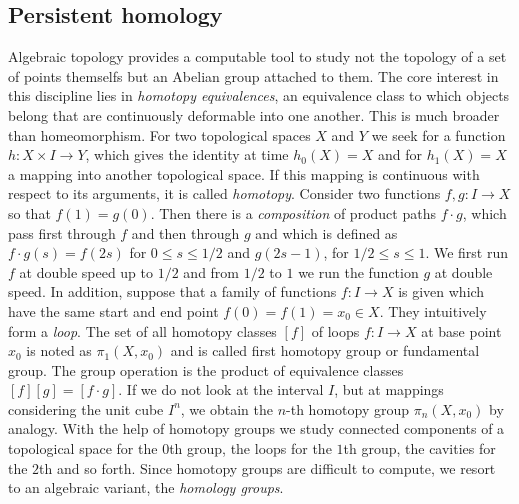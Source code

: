 \documentclass[runningheads,orivec]{llncs}
\begin{document}
\subsection{Persistent homology}
Algebraic topology provides a computable tool to study not the topology of a set of points themselfs but an Abelian group attached to them. The core interest in this discipline lies in \emph{homotopy equivalences}, an equivalence class to which objects belong that are continuously deformable into one another. This is much broader than homeomorphism. For two topological spaces $X$ and $Y$ we seek for a function $h: X \times I \rightarrow Y$, which gives the identity at time $h_0(X) = X$ and for $h_1(X) = X$ a mapping into another topological space. If this mapping is continuous with respect to its arguments, it is called \emph{homotopy}. Consider two functions $f,g: I \rightarrow X$ so that $f(1) = g(0)$. Then there is a \emph{composition} of product paths $f \cdot g$, which pass first through $f$ and then through $g$ and which is defined as $f \cdot g (s) = f(2s)$ for $0 \leq s \leq 1/2$ and $g(2s - 1)$, for $1/2 \leq s \leq 1$. We first run $f$ at double speed up to $1/2$ and from $1/2$ to $1$ we run the function $g$ at double speed. In addition, suppose that a family of functions $f: I \rightarrow X$ is given which have the same start and end point $f(0) = f(1) = x_0 \in X$. They intuitively form a \emph{loop}. The set of all homotopy classes $[f]$ of loops $f: I \rightarrow X$ at base point $x_0$ is noted as $\pi_1(X,x_0)$ and is called first homotopy group or fundamental group. The group operation is the product of equivalence classes $[f][g] = [f \cdot g]$. If we do not look at the interval $I$, but at mappings considering the unit cube $I^n$, we obtain the $n$-th homotopy group $\pi_n(X,x_0)$ by analogy. With the help of homotopy groups we study connected components of a topological space for the $0$th group, the loops for the $1$th group, the cavities for the $2$th and so forth. Since homotopy groups are difficult to compute, we resort to an algebraic variant, the \emph{homology groups}.
\end{document}
